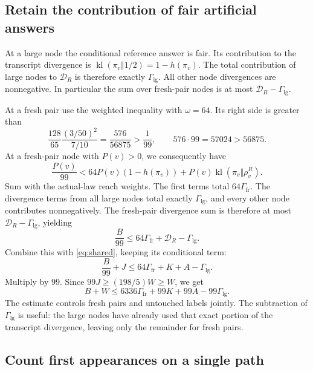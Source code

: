 \documentclass[11pt]{article}
\theoremstyle{definition}
\theoremstyle{remark}
\newcommand{\kl}{\operatorname{kl}}
\newcommand{\Glg}{\Gamma_{\mathrm{lg}}}
\newcommand{\Gfr}{\Gamma_{\mathrm{fr}}}
\numberwithin{equation}{section}
\begin{document}
\subsection{Retain the contribution of fair artificial answers}

At a large node the conditional reference answer is fair. Its
contribution to the transcript divergence is
\(\kl(\pi_v\Vert1/2)=1-h(\pi_v)\).
The total contribution of large nodes to \(\mathcal D_R\) is
therefore exactly \(\Glg\).
All other node divergences are nonnegative. In particular the sum
over fresh-pair nodes is at most \(\mathcal D_R-\Glg\).

At a fresh pair use the weighted inequality with \(\omega=64\).
Its right side is greater than
\[
 \frac{128}{65}\frac{(3/50)^2}{7/10}
 =\frac{576}{56875}>\frac1{99},
 \qquad 576\cdot99=57024>56875.
\]
At a fresh-pair node with \(P(v)>0\), we consequently have
\[
 \frac{P(v)}{99}
 <64P(v)(1-h(\pi_v))
   +P(v)\kl(\pi_v\Vert\rho_v^R).
\]
Sum with the actual-law reach weights. The first terms total
\(64\Gfr\). The divergence terms from all large nodes total exactly
\(\Glg\), and every other node contributes nonnegatively.
The fresh-pair divergence sum is therefore at most
\(\mathcal D_R-\Glg\), yielding
\begin{equation}\label{eq:freshsum}
 \frac B{99}\le64\Gfr+\mathcal D_R-\Glg.
\end{equation}
Combine this with \eqref{eq:shared}, keeping its conditional term:
\[
 \frac B{99}+J\le64\Gfr+K+A-\Glg.
\]
Multiply by \(99\). Since \(99J\ge(198/5)W\ge W\), we get
\begin{equation}\label{eq:coupled}
 \boxed{B+W\le6336\Gfr+99K+99A-99\Glg.}
\end{equation}
The estimate controls fresh pairs and untouched labels jointly.
The subtraction of \(\Glg\) is useful: the large nodes have already
used that exact portion of the transcript divergence, leaving only
the remainder for fresh pairs.

\subsection{Count first appearances on a single path}
\end{document}
